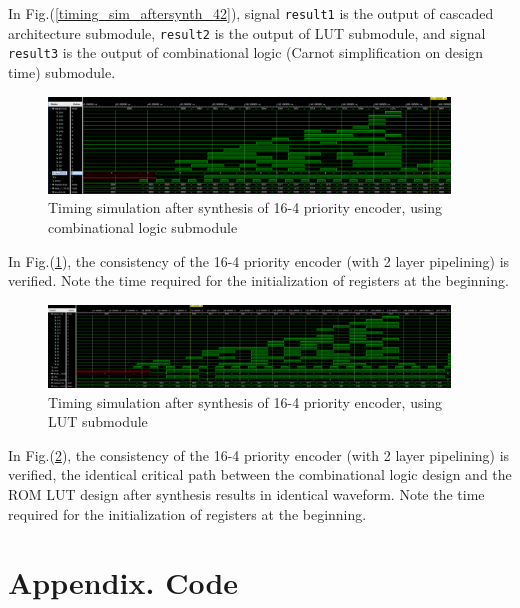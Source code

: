\documentclass[journal, onecolumn]{IEEEtran}
\begin{document}
In Fig.(\ref{timing_sim_aftersynth_42}), signal \lstinline{result1} is the output of cascaded architecture submodule, \lstinline{result2} is the output of LUT submodule, and signal \lstinline{result3} is the output of combinational logic (Carnot simplification on design time) submodule.

\begin{figure}[htpb]
  \begin{center}
    \includegraphics[width=0.95\textwidth]{report_lab3.assets/20240324195347.png}
    \caption{Timing simulation after synthesis of 16-4 priority encoder, using combinational logic submodule}
    \label{timing_sim_aftersynth_164_comb}
  \end{center}
\end{figure}

In Fig.(\ref{timing_sim_aftersynth_164_comb}), the consistency of the 16-4 priority encoder (with 2 layer pipelining) is verified. Note the time required for the initialization of registers at the beginning.

\begin{figure}[htpb]
  \begin{center}
    \includegraphics[width=0.95\textwidth]{report_lab3.assets/20240324195739.png}
    \caption{Timing simulation after synthesis of 16-4 priority encoder, using LUT submodule}
    \label{timing_sim_aftersynth_164_lut}
  \end{center}
\end{figure}

In Fig.(\ref{timing_sim_aftersynth_164_lut}), the consistency of the 16-4 priority encoder (with 2 layer pipelining) is verified, the identical critical path between the combinational logic design and the ROM LUT design after synthesis results in identical waveform. Note the time required for the initialization of registers at the beginning.

\section{\textbf{Appendix. Code}}
\end{document}
